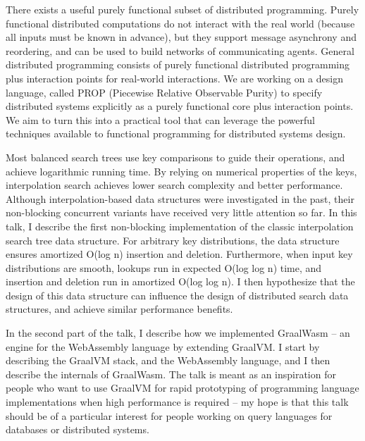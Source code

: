\documentclass[a4paper,UKenglish]{dagrep-v2018}
\begin{document}

\license

There exists a useful purely functional subset of distributed programming.  Purely functional distributed computations do not interact with the real world (because all inputs must be known in advance), but they support message asynchrony and reordering, and can be used to build networks of communicating agents.  General distributed programming consists of purely functional distributed programming plus interaction points for real-world interactions.  We are working on a design language, called PROP (Piecewise Relative Observable Purity) to specify distributed systems explicitly as a purely functional core plus interaction points.  We aim to turn this into a practical tool that can leverage the powerful techniques available to functional programming for distributed systems design.


\license

Most balanced search trees use key comparisons to guide their
operations, and achieve logarithmic running time. By relying on
numerical properties of the keys, interpolation search achieves lower
search complexity and better performance. Although interpolation-based
data structures were investigated in the past, their non-blocking
concurrent variants have received very little attention so far. In
this talk, I describe the first non-blocking implementation of the
classic interpolation search tree data structure. For arbitrary key
distributions, the data structure ensures amortized O(log n) insertion
and deletion. Furthermore, when input key distributions are smooth,
lookups run in expected O(log log n) time, and insertion and deletion
run in amortized O(log log n). I then hypothesize that the design of
this data structure can influence the design of distributed search
data structures, and achieve similar performance benefits.

In the second part of the talk, I describe how we implemented
GraalWasm -- an engine for the WebAssembly language by extending
GraalVM. I start by describing the GraalVM stack, and the WebAssembly
language, and I then describe the internals of GraalWasm. The talk is
meant as an inspiration for people who want to use GraalVM for rapid
prototyping of programming language implementations when high
performance is required -- my hope is that this talk should be of a
particular interest for people working on query languages for
databases or distributed systems.
\end{document}
